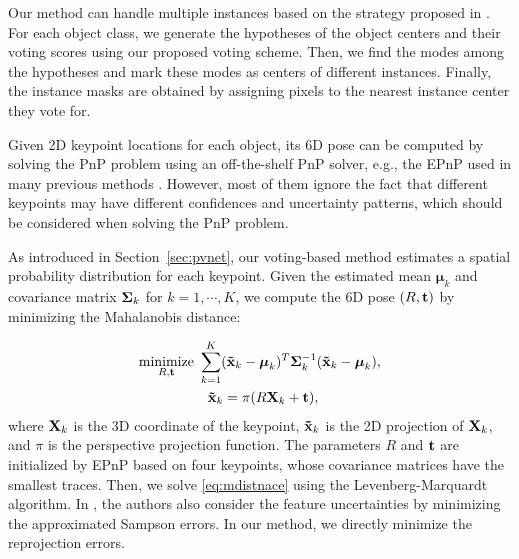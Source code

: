\documentclass[10pt,twocolumn,letterpaper]{article}
\begin{document}
Our method can handle multiple instances based on the strategy proposed in \cite{xiang2017posecnn, papandreou2018personlab}. For each object class, we generate the hypotheses of the object centers and their voting scores using our proposed voting scheme.
Then, we find the modes among the hypotheses and mark these modes as centers of different instances. Finally, the instance masks are obtained by assigning pixels to the nearest instance center they vote for.

Given 2D keypoint locations for each object, its 6D pose can be computed by solving the PnP problem using an off-the-shelf PnP solver, e.g., the EPnP \cite{lepetit2009epnp} used in many previous methods \cite{tekin2018real,rad2017bb8}.
However, most of them ignore the fact that different keypoints may have different confidences and uncertainty patterns, which should be considered when solving the PnP problem.      


As introduced in Section~\ref{sec:pvnet}, our voting-based method estimates a spatial probability distribution for each keypoint. Given the estimated mean ${\boldsymbol \mu_k}$ and covariance matrix ${\bf \Sigma}_k$ for $k=1,\cdots,K$, we compute the 6D pose $(R,{\bf t})$ by minimizing the Mahalanobis distance:

\begin{equation}
\begin{split}
    \underset{R,{\bf t}}{\text{minimize}}~ &\sum\limits_{k=1}^{K} ({\bf \tilde{x}}_k - \boldsymbol\mu_k)^T {\bf \Sigma}_k^{-1} ({\bf \tilde{x}}_k -\boldsymbol\mu_k),
	\\
    &~~{\bf \tilde{x}}_k = \pi(R {\bf X}_k + {\bf t}),
    \label{eq:mdistnace}
\end{split}
\end{equation}
where ${\bf X}_k$ is the 3D coordinate of the keypoint, ${\bf \tilde{x}}_k$ is the 2D projection of ${\bf X}_k$, and $\pi$ is the perspective projection function. The parameters $R$ and $\bf t$ are initialized by EPnP \cite{lepetit2009epnp} based on four keypoints, whose covariance matrices have the smallest traces. Then, we solve \eqref{eq:mdistnace} using the Levenberg-Marquardt algorithm. In \cite{ferraz2014leveraging}, the authors also consider the feature uncertainties by minimizing the approximated Sampson errors. In our method, we directly minimize the reprojection errors.
\end{document}

